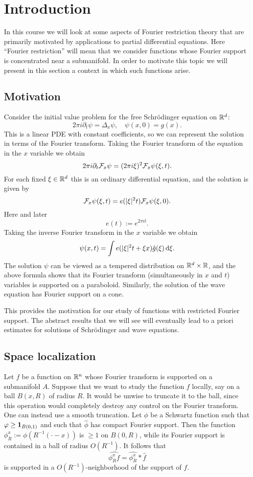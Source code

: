 \section{Introduction}
In this course we will look at some aspects of Fourier restriction theory that are primarily motivated by applications to partial differential equations.
Here ``Fourier restriction'' will mean that we consider functions whose Fourier support is concentrated near a submanifold.
In order to motivate this topic we will present in this section a context in which such functions arise.

\subsection{Motivation}
Consider the initial value problem for the free Schr\"odinger equation on $\mathbb{R}^{d}$:
\[
2\pi i \partial_{t} \psi = \Delta_{x} \psi,
\quad
\psi(x,0) = g(x).
\]
This is a linear PDE with constant coefficients, so we can represent the solution in terms of the Fourier transform.
Taking the Fourier transform of the equation in the $x$ variable we obtain
\[
2 \pi i \partial_{t} \mathcal{F}_{x} \psi = (2\pi i \xi)^{2} \mathcal{F}_{x} \psi(\xi,t).
\]
For each fixed $\xi \in \mathbb{R}^{d}$ this is an ordinary differential equation, and the solution is given by
\[
\mathcal{F}_{x} \psi(\xi,t) = e(\lvert\xi\rvert^{2} t) \mathcal{F}_{x} \psi(\xi,0).
\]
Here and later
\[
e(t) := e^{2\pi i t}.
\]
Taking the inverse Fourier transform in the $x$ variable we obtain
\[
\psi(x,t) = \int e(\lvert\xi\rvert^{2}t + \xi x) \hat{g}(\xi) \mathop{}\!\mathrm{d}\xi.
\]
The solution $\psi$ can be viewed as a tempered distribution on $\mathbb{R}^{d}\times \mathbb{R}$, and the above formula shows that its Fourier transform (simultaneously in $x$ and $t$) variables is supported on a paraboloid.
Similarly, the solution of the wave equation has Fourier support on a cone.

This provides the motivation for our study of functions with restricted Fourier support.
The abstract results that we will see will eventually lead to a priori estimates for solutions of Schr\"odinger and wave equations.

\subsection{Space localization}
Let $f$ be a function on $\mathbb{R}^{n}$ whose Fourier transform is supported on a submanifold $A$.
Suppose that we want to study the function $f$ locally, say on a ball $B(x,R)$ of radius $R$.
It would be unwise to truncate it to the ball, since this operation would completely destroy any control on the Fourier transform.
One can instead use a smooth truncation.
Let $\phi$ be a Schwartz function such that $\varphi \geq \mathbf{1}_{B(0,1)}$ and such that $\widehat{\phi}$ has compact Fourier support.
Then the function $\phi^{x}_{R} := \phi(R^{-1}(\cdot-x))$ is $\geq 1$ on $B(0,R)$, while its Fourier support is contained in a ball of radius $O(R^{-1})$.
It follows that
\[
\widehat{\phi^{x}_{R} f} = \widehat{\phi^{x}_{R}} * \widehat{f}
\]
is supported in a $O(R^{-1})$-neighborhood of the support of $f$.

